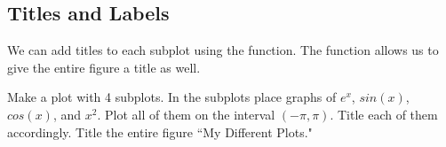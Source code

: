 \subsection*{Titles and Labels}

We can add titles to each subplot using the  function.
The  function allows us to give the entire figure a title as well.

\begin{problem}
Make a plot with 4 subplots.
In the subplots place graphs of $e^x$, $sin(x)$, $cos(x)$, and $x^2$.
Plot all of them on the interval $(-\pi,\pi)$.
Title each of them accordingly.
Title the entire figure ``My Different Plots."
\end{problem}

